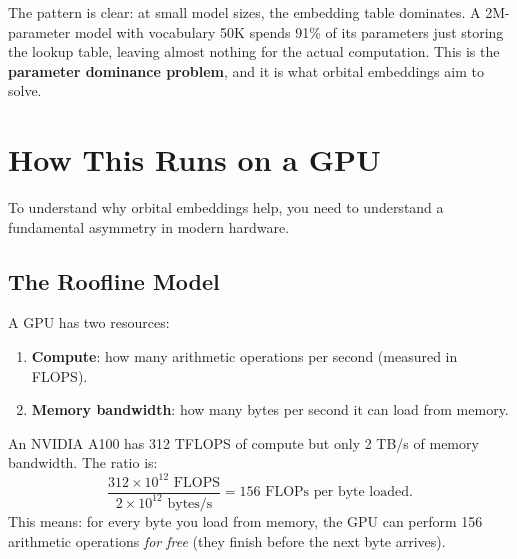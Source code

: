 \documentclass[11pt, a4paper]{article}
\theoremstyle{remark}
\begin{document}
The pattern is clear: at small model sizes, the embedding table dominates.
A 2M-parameter model with vocabulary 50K spends 91\% of its parameters just storing the lookup table, leaving almost nothing for the actual computation.
This is the \textbf{parameter dominance problem}, and it is what orbital embeddings aim to solve.


\section{How This Runs on a GPU}
\label{sec:gpu}

To understand why orbital embeddings help, you need to understand a fundamental asymmetry in modern hardware.

\subsection{The Roofline Model}

A GPU has two resources:
\begin{enumerate}[nosep]
    \item \textbf{Compute}: how many arithmetic operations per second (measured in FLOPS).
    \item \textbf{Memory bandwidth}: how many bytes per second it can load from memory.
\end{enumerate}

An NVIDIA A100 has 312 TFLOPS of compute but only 2 TB/s of memory bandwidth.
The ratio is:
\[
    \frac{312 \times 10^{12} \text{ FLOPS}}{2 \times 10^{12} \text{ bytes/s}} = 156 \text{ FLOPs per byte loaded.}
\]
This means: for every byte you load from memory, the GPU can perform 156 arithmetic operations \emph{for free} (they finish before the next byte arrives).
\end{document}
